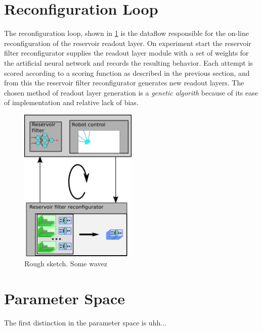 \section{Reconfiguration Loop}
The reconfiguration loop, shown in \ref{figReconfLoop} is the dataflow
responsible for the on-line reconfiguration of the reservoir readout layer.
On experiment start the reservoir filter reconfigurator supplies the readout
layer module with a set of weights for the artificial neural network and records
the resulting behavior.
Each attempt is scored according to a scoring function as described in the
previous section, and from this the reservoir filter reconfigurator generates
new readout layers.
The chosen method of readout layer generation is a \emph{genetic algorith}
because of its ease of implementation and relative lack of bias.
\begin{figure}[h!]
  \centering
  \includegraphics[width=0.5\textwidth]{fig/reconfigLoop.png}
  \caption{Rough sketch.
    Some wavez
  }
  \label{figReconfLoop}
\end{figure}
\section{Parameter Space}
The first distinction in the parameter space is 
uhh...
\cleardoublepage

